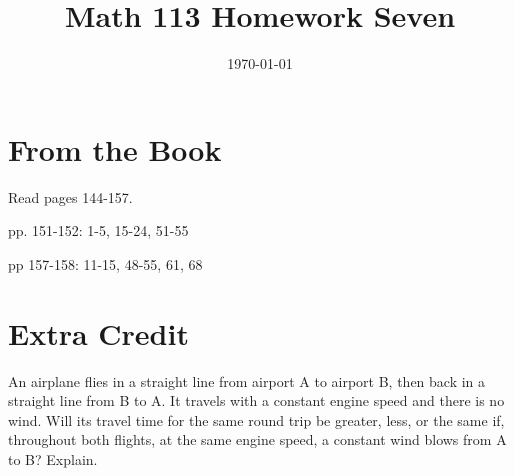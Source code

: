 \documentclass[fleqn,addpoints]{exam}
\title{Math 113 Homework Seven}
\author{}
\date{\today}
\begin{document}
\maketitle

\section{From the Book}


\begin{itemize*}
  \item Read pages 144-157.
  \item pp. 151-152: 1-5, 15-24, 51-55
  \item pp 157-158: 11-15, 48-55, 61, 68
\end{itemize*}

\section{Extra Credit}

An airplane flies in a straight line from airport A to airport B, then back in a straight line from B to A.  It travels
with a constant engine speed and there is no wind.  Will its travel time for the same round trip be greater, less, or
the same if, throughout both flights, at the same engine speed, a constant wind blows from A to B?  Explain.
\end{document}
